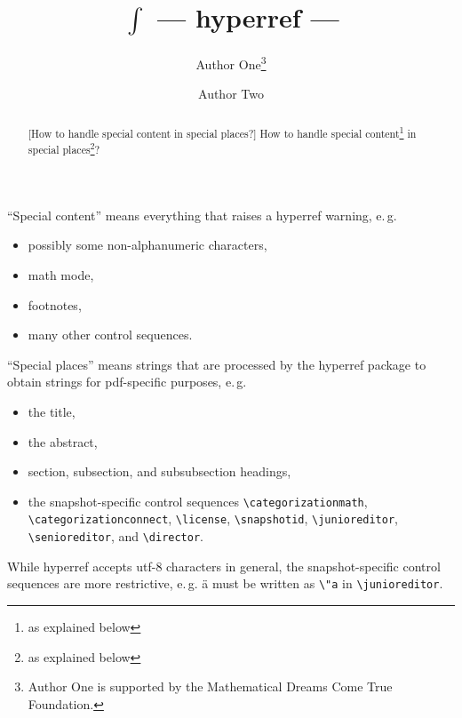 \documentclass{snapshotmfo}
\author{Author One\thanks{Author One is supported by the Mathematical Dreams Come True Foundation.} \and Author Two}
\title{\texorpdfstring{$\int$ }{}--- hyperref ---\texorpdfstring{ \reflectbox{$\int$}}{}}
\begin{document}

\begin{abstract}[How to handle special content in special places?]
How to handle special content\footnote{as explained below} in special places\footnote{as explained below}?
\end{abstract}

\noindent ``Special content'' means everything that raises a hyperref warning, e.\,g.
\begin{itemize}
  \item possibly some non-alphanumeric characters,
  \item math mode,
  \item footnotes,
  \item many other control sequences.
\end{itemize}

\noindent ``Special places'' means strings that are processed by the hyperref package to obtain strings for pdf-specific purposes, e.\,g.
\begin{itemize}
  \item the title,
  \item the abstract,
  \item section, subsection, and subsubsection headings,
  \item the snapshot-specific control sequences
  \verb+\categorizationmath+,\\
  \verb+\categorizationconnect+,
  \verb+\license+,
  \verb+\snapshotid+,
  \verb+\junioreditor+,\\
  \verb+\senioreditor+, and
  \verb+\director+.
\end{itemize}
While hyperref accepts utf-8 characters in general, the snapshot-specific control sequences are more restrictive, e.\,g. ä must be written as \verb+\"a+ in \verb+\junioreditor+.
\end{document}
